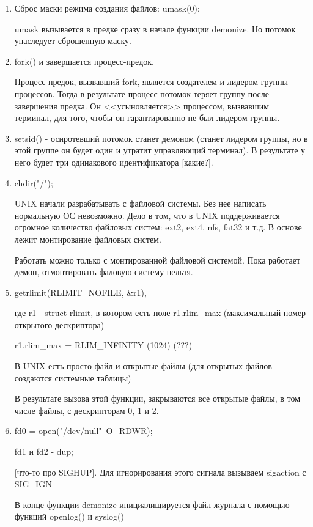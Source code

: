 \documentclass[a4paper, 14pt]{report}
\begin{document}
	\begin{enumerate}
		\item Сброс маски режима создания файлов: umask(0);
		
		umask вызывается в предке сразу в начале функции demonize. Но потомок унаследует сброшенную маску.
				
		\item fork() и завершается процесс-предок.
		
		Процесс-предок, вызвавший fork, является создателем и лидером группы процессов. Тогда в результате процесс-потомок теряет группу после завершения предка. Он <<усыновляется>> процессом, вызвавшим терминал, для того, чтобы он гарантированно не был лидером группы.
		
		\item setsid() - осиротевший потомок станет демоном (станет лидером группы, но в этой группе он будет один и утратит управляющий терминал). В результате у него будет три одинакового идентификатора [какие?].
		
		\item chdir("/");
		
		UNIX начали разрабатывать с файловой системы. Без нее написать нормальную ОС невозможно. Дело в том, что в UNIX поддерживается огромное количество файловых систем: ext2, ext4, nfs, fat32 и т.д. В основе лежит монтирование файловых систем.
		
		Работать можно только с монтированной файловой системой. Пока работает демон, отмонтировать фаловую систему нельзя.
		
		\item getrlimit(RLIMIT\_NOFILE, \&r1),
		
		где r1 - struct rlimit, в котором есть поле r1.rlim\_max (максимальный номер открытого дескриптора)
		
		r1.rlim\_max = RLIM\_INFINITY (1024) (???)
		
		В UNIX есть просто файл и открытые файлы (для открытых файлов создаются системные таблицы)
		
		В результате вызова этой функции, закрываются все открытые файлы, в том числе файлы, с дескрипторам 0, 1 и 2.
		
		\item fd0 = open("/dev/null"\ O\_RDWR);
		
		fd1 и fd2 - dup;
		
		[что-то про SIGHUP]. Для игнорирования этого сигнала вызываем sigaction с SIG\_IGN
		
		В конце функции demonize инициалищируется файл журнала с помощью функций openlog() и syslog()
	\end{enumerate}
\end{document}
